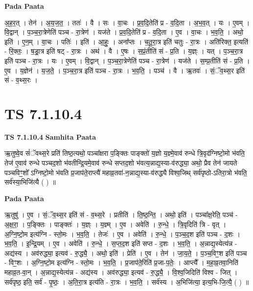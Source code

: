 \documentclass[17pt]{extarticle}
\begin{document}
\textbf{Pada Paata} \newline

अ॒ह॒र॒त् । तेन॑ । अ॒य॒ज॒त॒ । ततः॑ । वै । सः । वा॒चः । प्र॒व॒दि॒तेति॑ प्र - व॒दि॒ता । अ॒भ॒व॒त् । यः । ए॒वम् । वि॒द्वान् । प॒ञ्च॒रा॒त्रेणेति॑ पञ्च - रा॒त्रेण॑ । यज॑ते । प्र॒व॒दि॒तेति॑ प्र - व॒दि॒ता । ए॒व । वा॒चः । भ॒व॒ति॒ । अथो॒ इति॑ । ए॒न॒म् । वा॒चः । पतिः॑ । इति॑ । आ॒हुः॒ । अना᳚प्तः । च॒तू॒रा॒त्र इति॑ चतुः - रा॒त्रः । अति॑रिक्त॒ इत्यति॑ - रि॒क्तः॒ । ष॒ड्रा॒त्र इति॑ षट् - रा॒त्रः । अथ॑ । वै । ए॒षः । स॒प्रं॒तीति॑ सं - प्र॒ति । य॒ज्ञ्ः । यत् । प॒ञ्च॒रा॒त्र इति॑ पञ्च - रा॒त्रः । यः । ए॒वम् । वि॒द्वान् । प॒ञ्च॒रा॒त्रेणेति॑ पञ्च - रा॒त्रेण॑ । यज॑ते । स॒म्प्र॒तीति॑ सं - प्र॒ति । ए॒व । य॒ज्ञेन॑ । य॒ज॒ते॒ । प॒ञ्च॒रा॒त्र इति॑ पञ्च - रा॒त्रः । भ॒व॒ति॒ । पञ्च॑ । वै । ऋ॒तवः॑ । सं॒ॅव॒थ्स॒र इति॑ सं - व॒थ्स॒रः ।  \newline





\section{ TS 7.1.10.4 }

\textbf{TS 7.1.10.4 } \newline
\textbf{Samhita Paata} \newline

ऋ॒तुष्वे॒व सं॑ॅवथ्स॒रे प्रति॑ तिष्ठ॒त्यथो॒ पञ्चा᳚क्षरा प॒ङ्क्तिः पाङ्क्तो॑ य॒ज्ञो य॒ज्ञ्मे॒वाव॑ रुन्धे त्रि॒वृद॑ग्निष्टो॒मो भ॑वति॒ तेज॑ ए॒वाव॑ रुन्धे पञ्चद॒शो भ॑वतीन्द्रि॒यमे॒वाव॑ रुन्धे सप्तद॒शो भ॑वत्य॒न्नाद्य॒स्या-व॑रुद्ध्या॒ अथो॒ प्रैव तेन॑ जायते पञ्चविꣳ॒॒शो᳚ ऽग्निष्टो॒मो भ॑वति प्र॒जाप॑ते॒राप्त्यै॑ महाव्र॒तवा॑-न॒न्नाद्य॒स्या-व॑रुद्ध्यै विश्व॒जिथ् सर्व॑पृष्ठो-ऽतिरा॒त्रो भ॑वति॒ सर्व॑स्या॒भिजि॑त्यै ( ) ॥ \newline

\textbf{Pada Paata} \newline

ऋ॒तुषु॑ । ए॒व । सं॒ॅव॒थ्स॒र इति॑ सं - व॒थ्स॒रे । प्रतीति॑ । ति॒ष्ठ॒न्ति॒ । अथो॒ इति॑ । पञ्चा᳚क्ष॒रेति॒ पञ्च॑ - अ॒क्ष॒रा॒ । प॒ङ्क्तिः । पाङ्क्तः॑ । य॒ज्ञ्ः । य॒ज्ञ्म् । ए॒व । अवेति॑ । रु॒न्धे॒ । त्रि॒वृदिति॑ त्रि - वृत् । अ॒ग्नि॒ष्टो॒म इत्य॑ग्नि - स्तो॒मः । भ॒व॒ति॒ । तेजः॑ । ए॒व । अवेति॑ । रु॒न्धे॒ । प॒ञ्च॒द॒श इति॑ पञ्च - द॒शः । भ॒व॒ति॒ । इ॒न्द्रि॒यम् । ए॒व । अवेति॑ । रु॒न्धे॒ । स॒प्त॒द॒श इति॑ सप्त - द॒शः । भ॒व॒ति॒ । अ॒न्नाद्य॒स्येत्य॑न्न - अद्य॑स्य । अव॑रुद्ध्या॒ इत्यव॑ - रु॒द्ध्यै॒ । अथो॒ इति॑ । प्रेति॑ । ए॒व । तेन॑ । जा॒य॒ते॒ । प॒ञ्च॒विꣳ॒॒श इति॑ पञ्च - विꣳ॒॒शः । अ॒ग्नि॒ष्टो॒म इत्य॑ग्नि - स्तो॒मः । भ॒व॒ति॒ । प्र॒जाप॑ते॒रिति॑ प्र॒जा-प॒तेः॒ । आप्त्यै᳚ । म॒हा॒व्र॒तवा॒निति॑ महाव्र॒त-वा॒न् । अ॒न्नाद्य॒स्येत्य॑न्न - अद्य॑स्य । अव॑रुद्ध्या॒ इत्यव॑ - रु॒द्ध्यै॒ । वि॒श्व॒जिदिति॑ विश्व - जित् । सर्व॑पृष्ठ॒ इति॒ सर्व॑ - पृ॒ष्ठः॒ । अ॒ति॒रा॒त्र इत्य॑ति - रा॒त्रः । भ॒व॒ति॒ । सर्व॑स्य । अ॒भिजि॑त्या॒ इत्य॒भि-जि॒त्यै॒ ( ) ॥  \newline
\end{document}
